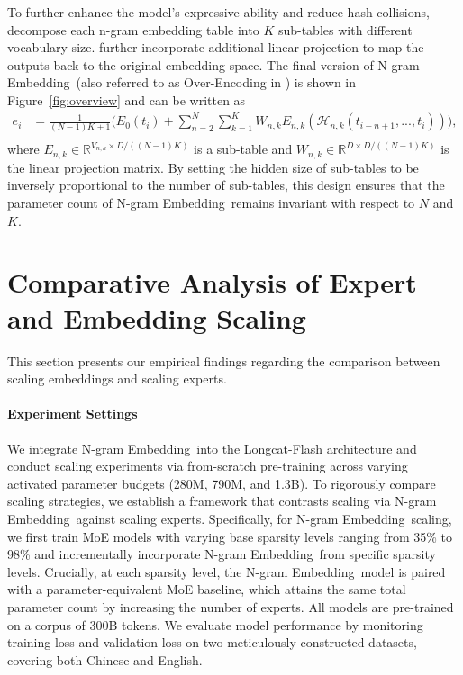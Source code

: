 \documentclass{article}
\newcommand{\method}{N-gram Embedding}
\begin{document}
To further enhance the model's expressive ability and reduce hash collisions, \cite{clark-etal-2022-canine,huang2025overtokenizedtransformervocabularygenerally} decompose each n-gram embedding table into $K$ sub-tables with different vocabulary size. \cite{huang2025overtokenizedtransformervocabularygenerally} further incorporate additional linear projection to map the outputs back to the original embedding space. The final version of \method\ (also referred to as Over-Encoding in \cite{huang2025overtokenizedtransformervocabularygenerally}) is shown in Figure~\ref{fig:overview} and can be written as 
\begin{equation}
\label{eq:ne-v2}
    \begin{aligned}
        e_i &= \frac{1}{(N-1)K+1}\Big(E_0(t_i) + \sum_{n=2}^N \sum_{k=1}^K W_{n,k}E_{n,k}(\mathcal{H}_{n,k}({t_{i-n+1}, ..., t_i}))\Big), \\
    \end{aligned}
\end{equation}
where $E_{n,k} \in \mathbb{R}^{V_{n,k} \times D/((N-1)K)}$ is a sub-table and $W_{n,k} \in \mathbb{R}^{D \times D/((N-1)K)}$ is the linear projection matrix.
By setting the hidden size of sub-tables to be inversely proportional to the number of sub-tables, this design ensures that the parameter count of \method\ remains invariant with respect to $N$ and $K$.




\section{Comparative Analysis of Expert and Embedding Scaling}

This section presents our empirical findings regarding the comparison between scaling embeddings and scaling experts.

\paragraph{Experiment Settings}
We integrate \method\ into the Longcat-Flash architecture \citep{meituanlongcatteam2025longcatflashtechnicalreport} and conduct scaling experiments via from-scratch pre-training across varying activated parameter budgets (280M, 790M, and 1.3B). To rigorously compare scaling strategies, we establish a framework that contrasts scaling via \method\ against scaling experts. 
Specifically, for \method\ scaling, we first train MoE models with varying base sparsity levels ranging from 35\% to 98\% and incrementally incorporate \method\ from specific sparsity levels. %
Crucially, at each sparsity level, the \method\ model is paired with a parameter-equivalent MoE baseline, which attains the same total parameter count by increasing the number of experts.
All models are pre-trained on a corpus of 300B tokens. We evaluate model performance by monitoring training loss and validation loss on two meticulously constructed datasets, covering both Chinese and English.
\end{document}
